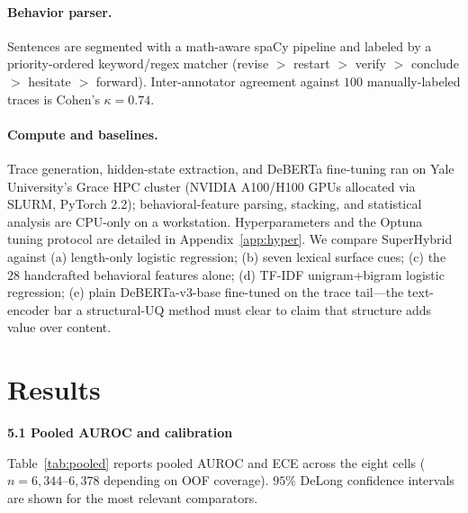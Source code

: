 \documentclass{article}
\begin{document}
\paragraph{Behavior parser.} Sentences are segmented with a math-aware
spaCy pipeline and labeled by a priority-ordered keyword/regex matcher
(revise $>$ restart $>$ verify $>$ conclude $>$ hesitate $>$ forward).
Inter-annotator agreement against $100$ manually-labeled traces is
Cohen's $\kappa = 0.74$.

\paragraph{Compute and baselines.} Trace generation, hidden-state
extraction, and DeBERTa fine-tuning ran on Yale University's Grace HPC
cluster (NVIDIA A100/H100 GPUs allocated via SLURM, PyTorch 2.2);
behavioral-feature parsing, stacking, and statistical analysis are CPU-only
on a workstation. Hyperparameters and the Optuna tuning protocol are
detailed in Appendix~\ref{app:hyper}. We compare SuperHybrid against
(a) length-only logistic regression; (b) seven lexical surface cues;
(c) the $28$ handcrafted behavioral features alone;
(d) TF-IDF unigram+bigram logistic regression; (e) plain DeBERTa-v3-base
fine-tuned on the trace tail---the text-encoder bar a structural-UQ method
must clear to claim that structure adds value over content.

\section{Results}

\textbf{5.1 Pooled AUROC and calibration}

Table~\ref{tab:pooled} reports pooled AUROC and ECE across the eight cells
($n = 6{,}344$--$6{,}378$ depending on OOF coverage). $95\%$ DeLong
confidence intervals are shown for the most relevant comparators.
\end{document}
